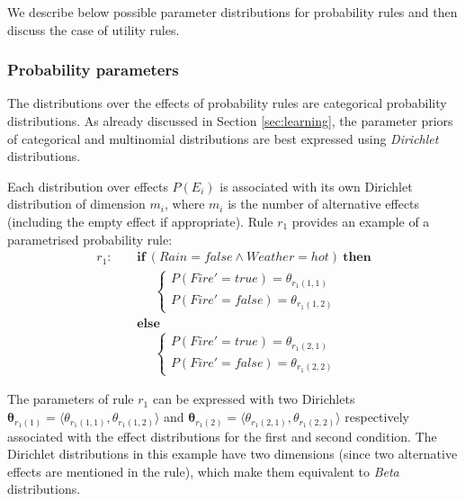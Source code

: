 We describe below possible parameter distributions for probability rules and then discuss the case of utility rules.  

\subsubsection*{Probability parameters}

The distributions over the effects of probability rules are categorical probability distributions.  As already discussed in Section \ref{sec:learning}, the parameter priors of categorical and multinomial distributions are best expressed using \textit{Dirichlet} distributions. 

Each distribution over effects $P(E_i)$ is associated with its own Dirichlet distribution of dimension $m_i$, where $m_i$ is the number of alternative effects (including the empty effect if appropriate).  Rule $r_{1}$ provides an example of a parametrised probability rule: 
\begin{align*}
r_{1}: \ \ \ \ \ & \textbf{if} \ (\mathit{Rain}\!=\!\mathit{false} \land \mathit{Weather}\!=\!\mathit{hot}) \ \textbf{then} \\
& \;\;\;\;\;  \begin{cases}
 P(\mathit{Fire}'\!=\!\mathit{true}) = \theta_{r_{1}(1,1)} \\ 
P(\mathit{Fire}'\!=\!\mathit{false}) = \theta_{r_{1}(1,2)}
\end{cases}  \\ 
& \textbf{else} \\
& \;\;\;\;\; \begin{cases}
P(\mathit{Fire}'\!=\!\mathit{true}) = \theta_{r_{1}(2,1)} \\
P(\mathit{Fire}'\!=\!\mathit{false}) = \theta_{r_{1}(2,2)}
\end{cases} 
\end{align*}


The parameters of rule $r_{1}$ can be expressed with two Dirichlets $\boldsymbol\theta_{r_{1}(1)} = \langle \theta_{r_{1}(1,1)},\theta_{r_{1}(1,2)} \rangle$ and $\boldsymbol\theta_{r_{1}(2)} = \langle \theta_{r_{1}(2,1)}, \theta_{r_{1}(2,2)} \rangle$ respectively associated with the effect distributions for the first and second condition.  The Dirichlet distributions in this example have two dimensions (since two alternative effects are mentioned in the rule), which make them equivalent to \textit{Beta} distributions. 

